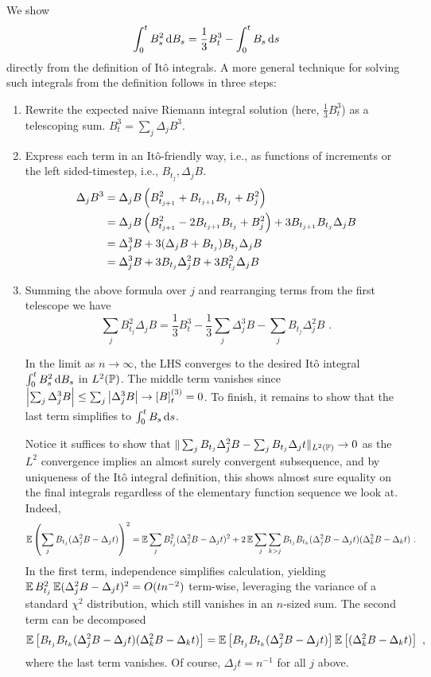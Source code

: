 \documentclass{article}
\begin{document}
\subsection{}


We show
\[
  \int_0^t B_s^2\d{B_s}=\frac{1}{3}B_t^3-\int_0^tB_s\d{s}
\]
directly from the definition of It\^{o} integrals. A more general technique for solving such integrals from the definition follows in three steps:

\begin{enumerate}
\item Rewrite the expected naive Riemann integral solution (here, \(\frac{1}{3}B_t^3\)) as a telescoping sum. \(B_t^3=\sum_j\Delta_jB^3\).
\item Express each term in an It\^{o}-friendly way, i.e., as functions of increments or the left sided-timestep, i.e., \(B_{t_j},\Delta_jB\).
  \begin{align*}
    \Delta_jB^3&=\Delta_jB\pa{B_{t_{j+1}}^2+B_{t_{j+1}}B_{t_j}+B_{j}^2}\\
    &=\Delta_jB\pa{B_{t_{j+1}}^2-2B_{t_{j+1}}B_{t_j}+B_{j}^2}+3B_{t_{j+1}}B_{t_j}\Delta_jB\\
    &=\Delta_j^3B+3(\Delta_jB+B_{t_j})B_{t_j}\Delta_jB\\
    &=\Delta_j^3B+3B_{t_j}\Delta_j^2B+3B_{t_j}^2\Delta_jB
  \end{align*}
\item Summing the above formula over \(j\) and rearranging terms from the first telescope we have
  \[
    \sum_jB_{t_j}^2\Delta_jB=\frac{1}{3}B_t^3-\frac{1}{3}\sum_j\Delta_j^3B-\sum_jB_{t_j}\Delta_j^2B\,\,.
  \]

  In the limit as \(n\rightarrow\infty\), the LHS converges to the desired It\^{o} integral \(  \int_0^t B_s^2\d{B_s}\) in \(L^2(\P)\). The middle term vanishes since \(\abs{\sum_j\Delta_j^3B}\le\sum_j\abs{\Delta_j^3B}\rightarrow[B]_t^{(3)}=0\). To finish, it remains to show that the last term simplifies to \(\int_0^tB_s\d{s}\).

  Notice it suffices to show that \(\|\sum_jB_{t_j}\Delta_j^2B-\sum_jB_{t_j}\Delta_jt\|_{L^2(\P)}\rightarrow 0\) as the \(L^2\) convergence implies an almost surely convergent subsequence, and by uniqueness of the It\^{o} integral definition, this shows almost sure equality on the final integrals regardless of the elementary function sequence we look at. Indeed,
\begin{align*}
  \E\pa{\sum_jB_{t_j}(\Delta_j^2B-\Delta_jt)}^2
    &=\E\sum_jB_{t_j}^2(\Delta_j^2B-\Delta_jt)^2+2\E\sum_j\sum_{k> j}B_{t_j}B_{t_k}(\Delta_j^2B-\Delta_jt)(\Delta_k^2B-\Delta_kt)\,\,.
\end{align*}
In the first term, independence simplifies calculation, yielding \(\E B_{t_j}^2\E(\Delta_j^2B-\Delta_jt)^2=O(tn^{-2})\) term-wise, leveraging the variance of a standard \(\chi^2\) distribution, which still vanishes in an \(n\)-sized sum. The second term can be decomposed
\[
  \E \ha{B_{t_j}B_{t_k}(\Delta_j^2B-\Delta_jt)(\Delta_k^2B-\Delta_kt)}
  =  \E \ha{B_{t_j}B_{t_k}(\Delta_j^2B-\Delta_jt)}\E\ha{(\Delta_k^2B-\Delta_kt)}\,\,,
\]
where the last term vanishes. Of course, \(\Delta_jt=n^{-1}\) for all \(j\) above.
  \end{enumerate}
\end{document}
